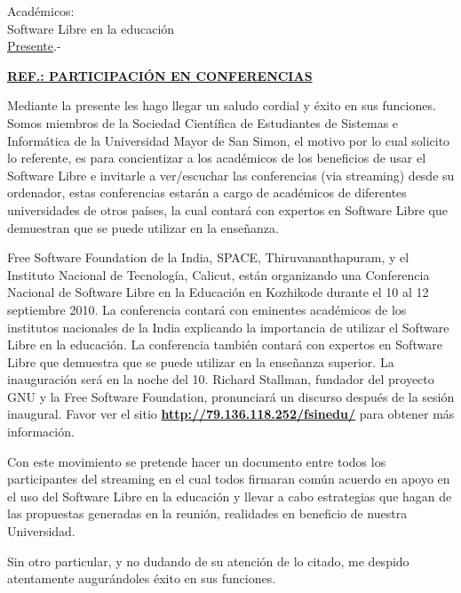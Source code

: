 \documentclass[a4paper,10pt]{letter}
\begin{document}
\date{7 de septiembre de 2010}

\begin{letter}{Acad\'emicos: \\ Software Libre en la educaci\'on \\ \underline{Presente}.-}
\begin{center}
\opening{\underline{{\bfseries REF.:  PARTICIPACI\'ON EN CONFERENCIAS}}}
\end{center}

Mediante la presente les hago llegar un saludo cordial y éxito en sus funciones. Somos miembros de la Sociedad Científica de Estudiantes de Sistemas e Informática de la Universidad Mayor de San Simon, el motivo por lo cual solicito lo referente, es para concientizar a los académicos de los beneficios de usar el Software Libre e invitarle a ver/escuchar las conferencias (via streaming) desde su ordenador, estas conferencias estar\'an a cargo de académicos de diferentes universidades de otros países, la cual contará con expertos en Software Libre que demuestran que se puede utilizar en la enseñanza.

Free Software Foundation de la India, SPACE, Thiruvananthapuram, y el Instituto Nacional de Tecnología, Calicut, están organizando una Conferencia Nacional de Software Libre en la Educación en Kozhikode durante el 10 al 12 septiembre 2010. La conferencia contará con eminentes académicos de los institutos nacionales de la India explicando la importancia de utilizar el Software Libre en la educación. La conferencia también contará con expertos en Software Libre que demuestra que se puede utilizar en la enseñanza superior. La inauguración será en la noche del 10. Richard Stallman, fundador del proyecto GNU y la Free Software Foundation, pronunciará un discurso después de la sesión inaugural. Favor ver el sitio {\bfseries \url{http://79.136.118.252/fsinedu/}} para obtener más información.

Con este movimiento se pretende hacer un documento entre todos los participantes del streaming en el cual todos firmaran común acuerdo en apoyo en el uso del Software Libre en la educación y llevar a cabo estrategias que hagan de las propuestas generadas en la reunión, realidades en beneficio de nuestra Universidad.

Sin otro particular, y no dudando de su atenci\'on de lo citado, me despido atentamente augur\'andoles \'exito en sus funciones.\\


\end{letter}
\end{document}
